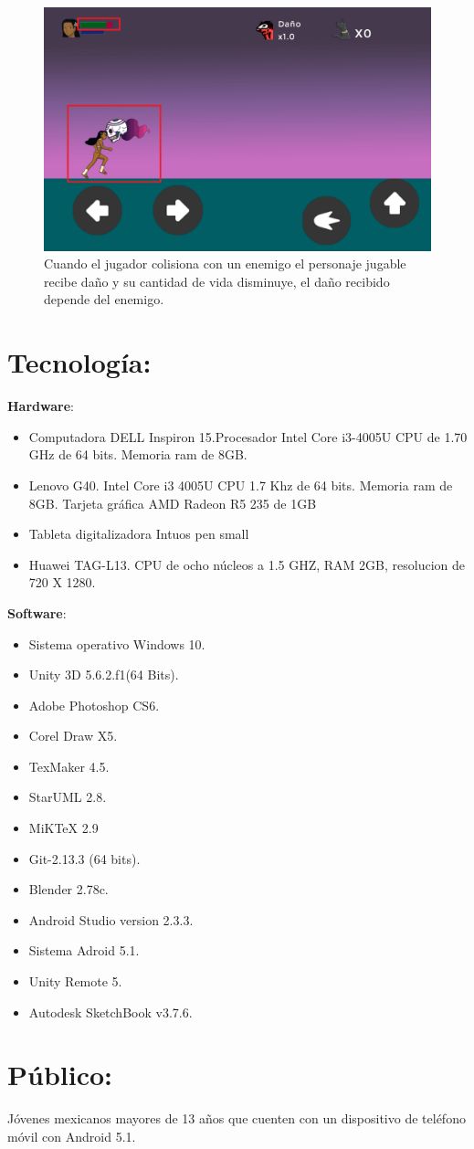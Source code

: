 \begin{figure}
				\centering
				\includegraphics[height=0.3 \textheight]{Imagenes/nivel02_danio}
				\caption{Cuando el jugador colisiona con un enemigo el personaje jugable recibe daño y su cantidad de  vida disminuye, el daño recibido depende del enemigo.}
				\label{fig:Danio}
\end{figure}	%
	\section{Tecnología:}
\textbf{Hardware}:
\begin{itemize}
	\item Computadora DELL Inspiron 15.Procesador Intel Core i3-4005U CPU de 1.70 GHz de 64 bits. Memoria ram de 8GB.
	\item Lenovo G40. Intel Core i3 4005U CPU 1.7 Khz de 64 bits. Memoria ram de 8GB. Tarjeta gráfica AMD Radeon R5 235 de 1GB
	\item Tableta digitalizadora Intuos pen small
	\item Huawei TAG-L13. CPU de ocho núcleos a 1.5 GHZ, RAM 2GB, resolucion de 720 X 1280.
\end{itemize}
\textbf{Software}:
\begin{itemize}
	\item Sistema operativo Windows 10.
	\item Unity 3D 5.6.2.f1(64 Bits).
	\item Adobe Photoshop CS6.
	\item Corel Draw X5.
	\item TexMaker 4.5.
	\item StarUML 2.8.
	\item MiKTeX 2.9
	\item Git-2.13.3 (64 bits).
	\item Blender 2.78c.
	\item Android Studio version 2.3.3.
	\item Sistema Adroid 5.1.
	\item Unity Remote 5.
	\item Autodesk SketchBook  v3.7.6.
	
\end{itemize}	
\section{Público:}
Jóvenes mexicanos mayores de 13 años que cuenten con un dispositivo de teléfono móvil con Android 5.1.
